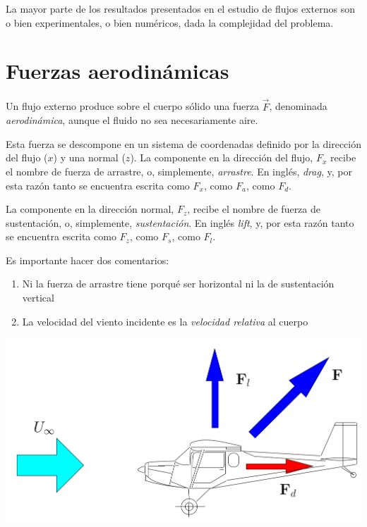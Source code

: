 	La mayor parte de los resultados presentados en el estudio de flujos
	externos son o bien experimentales, o bien numéricos, dada la complejidad
	del problema.


\section{Fuerzas aerodinámicas}

	
	Un flujo externo produce sobre el cuerpo sólido una fuerza $\vec{F}$,
	denominada \textit{aerodinámica}, aunque el fluido no sea necesariamente
	aire.
	
	Esta fuerza se descompone en un sistema de coordenadas definido por
	la dirección del flujo ($x$) y una normal ($z$). La componente en
	la dirección del flujo, $F_{x}$ recibe el nombre de fuerza de arrastre,
	o, simplemente, \textit{arrastre}. En inglés, \textit{drag}, y, por
	esta razón tanto se encuentra escrita como $F_{x}$, como $F_{a}$,
	como $F_{d}$.
	
	La componente en la dirección normal, $F_{z}$, recibe el nombre de
	fuerza de sustentación, o, simplemente, \textit{sustentación}. En
	inglés \textit{lift}, y, por esta razón tanto se encuentra escrita
	como $F_{z}$, como $F_{s}$, como $F_{l}$.
	
	Es importante hacer dos comentarios: 
	\begin{enumerate}
		\item Ni la fuerza de arrastre tiene porqué ser horizontal ni la de sustentación
		vertical 
		\item La velocidad del viento incidente es la \textit{velocidad relativa}
		al cuerpo 
	\end{enumerate}
\begin{center}
	\includegraphics[width=\linewidth]{TeX_files/chapter09-Externo/plane}
\end{center}


